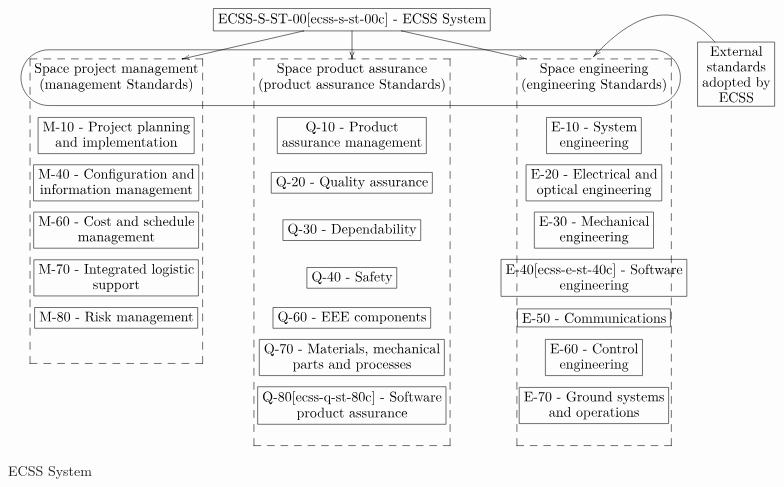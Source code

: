 \else
\begin{figure}[!ht]
\footnotesize
\begin{displaymath}
\xymatrix@=.28cm{
  & *+[F-]{\txt{ECSS-S-ST-00\cite{ecss-s-st-00c} - ECSS System}} \ar@{->}[d] \ar@{->}[dl] \ar@{->}[dr] & \\
	\h\a{\txt{Space project management\\(management Standards)}}
  & \b{\txt{Space product assurance\\(product assurance Standards)}}
  & \b{\txt{Space engineering\\(engineering Standards)}} & *+[F]{\txt{External\\standards\\adopted by\\ECSS}}\ar@/{}_{3pc}/@{->}[];"h"+<3.1pt,28.3pt>+\\
	*+[F]{\txt{M-10 - Project planning\\and implementation}}
  & *+[F]{\txt{Q-10 - Product\\assurance management}}
  & *+[F]{\txt{E-10 - System\\engineering}}\\
	*+[F]{\txt{M-40 - Configuration and\\information management}}
  & *+[F]{\txt{Q-20 - Quality assurance}}
  & *+[F]{\txt{E-20 - Electrical and\\optical engineering}}\\
	*+[F]{\txt{M-60 - Cost and schedule\\management}}
  & *+[F]{\txt{Q-30 - Dependability}}
  & *+[F]{\txt{E-30 - Mechanical\\engineering}}\\
	*+[F]{\txt{M-70 - Integrated logistic\\support}}
  & *+[F]{\txt{Q-40 - Safety}}
  & *+[F]{\txt{E-40\cite{ecss-e-st-40c} - Software\\engineering}}\\
	*+[F]{\txt{M-80 - Risk management}}
  & *+[F]{\txt{Q-60 - EEE components}}
  & *+[F]{\txt{E-50 - Communications}}\\
  & *+[F]{\txt{Q-70 - Materials, mechanical\\parts and processes}}
  & *+[F]{\txt{E-60 - Control\\engineering}}\\
  & *+[F]{\txt{Q-80\cite{ecss-q-st-80c} - Software\\product assurance}}
  & *+[F]{\txt{E-70 - Ground systems\\and operations}}\\
  & & &
}
\end{displaymath}
    \caption{\protect\ac{ECSS} System}\label{fig:ecssdocsstruct}
\end{figure}
\fi

